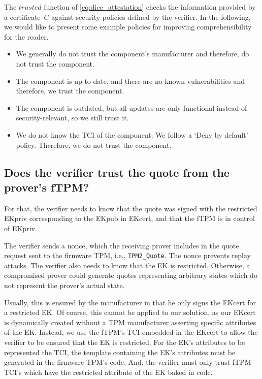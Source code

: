 The \(trusted\) function of \autoref{eq:dice_attestation} checks the information provided by a certificate~\(C\) against security policies defined by the verifier.
In the following, we would like to present some example policies for improving comprehensibility for the reader.

\begin{itemize}
    \item We generally do not trust the component's manufacturer and therefore, do not trust the component.
    \item The component is up-to-date, and there are no known vulnerabilities and therefore, we trust the component.
    \item The component is outdated, but all updates are only functional instead of security-relevant, so we still trust it.
    \item We do not know the TCI of the component. We follow a `Deny by default' policy. Therefore, we do not trust the component.
\end{itemize}

\subsection{Does the verifier trust the quote from the prover's fTPM?}\label{subsec:trust_quote_from_prover}

For that, the verifier needs to know that the quote was signed with the restricted EKpriv corresponding to the EKpub in EKcert, and that the fTPM is in control of EKpriv.

The verifier sends a nonce, which the receiving prover includes in the quote request sent to the firmware TPM, i.e., \texttt{TPM2\_Quote}.
The nonce prevents replay attacks.
The verifier also needs to know that the EK is restricted.
Otherwise, a compromised prover could generate quotes representing arbitrary states which do not represent the prover's actual state.

Usually, this is ensured by the manufacturer in that he only signs the EKcert for a restricted EK\@.
Of course, this cannot be applied to our solution, as our EKcert is dynamically created without a TPM manufacturer asserting specific attributes of the EK\@.
Instead, we use the fTPM's TCI embedded in the EKcert to allow the verifier to be ensured that the EK is restricted.
For the EK's attributes to be represented the TCI, the template containing the EK's attributes must be generated in the firmware TPM's code.
And, the verifier must only trust fTPM TCI's which have the restricted attribute of the EK baked in code.

